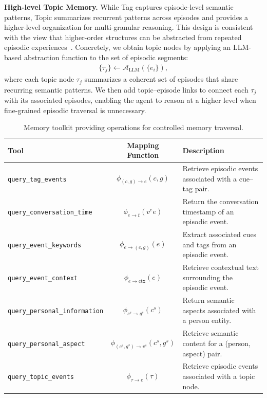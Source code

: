 \textbf{High-level Topic Memory.}
While Tag captures episode-level semantic patterns, Topic summarizes recurrent patterns across episodes and provides a higher-level organization for multi-granular reasoning.
This design is consistent with the view that higher-order structures can be abstracted from repeated episodic experiences~\cite{pan2025secom, tan2025prospect}.
Concretely, we obtain topic nodes by applying an LLM-based abstraction function to the set of episodic segments:
\begin{align}
\{\tau_j\} \leftarrow \mathcal{A}_{\text{LLM}}(\{e_i\}),
\end{align}
where each topic node $\tau_j$ summarizes a coherent set of episodes that share recurring semantic patterns.
We then add topic--episode links to connect each $\tau_j$ with its associated episodes, enabling the agent to reason at a higher level when fine-grained episodic traversal is unnecessary.
\begin{table}[t]
\caption{Memory toolkit providing operations for controlled memory traversal.}
\centering
\begin{tabular}{lcl}
\toprule
\textbf{Tool} & \textbf{Mapping Function} & \textbf{Description} \\
\midrule
\texttt{query\_tag\_events}
& $\phi_{(c,g)\rightarrow e}(c,g)$
& Retrieve episodic events associated with a cue--tag pair. \\

\texttt{query\_conversation\_time}
& $\phi_{e\rightarrow t}(v^{e}e)$
& Return the conversation timestamp of an episodic event. \\

\texttt{query\_event\_keywords}
& $\phi_{e\rightarrow (c,g)}(e)$
& Extract associated cues and tags from an episodic event. \\

\texttt{query\_event\_context}
& $\phi_{e\rightarrow \mathrm{ctx}}(e)$
& Retrieve contextual text surrounding the episodic event. \\

\texttt{query\_personal\_information}
& $\phi_{c^{s}\rightarrow g^{s}}(c^{s})$
& Return semantic aspects associated with a person entity. \\

\texttt{query\_personal\_aspect}
& $\phi_{(c^{s},g^{s})\rightarrow v^{s}}(c^{s},g^{s})$
& Retrieve semantic content for a (person, aspect) pair. \\

\texttt{query\_topic\_events}
& $\phi_{\tau\rightarrow e}(\tau)$
& Retrieve episodic events associated with a topic node. \\
\bottomrule
\end{tabular}
\label{tab:tools}
\end{table}


